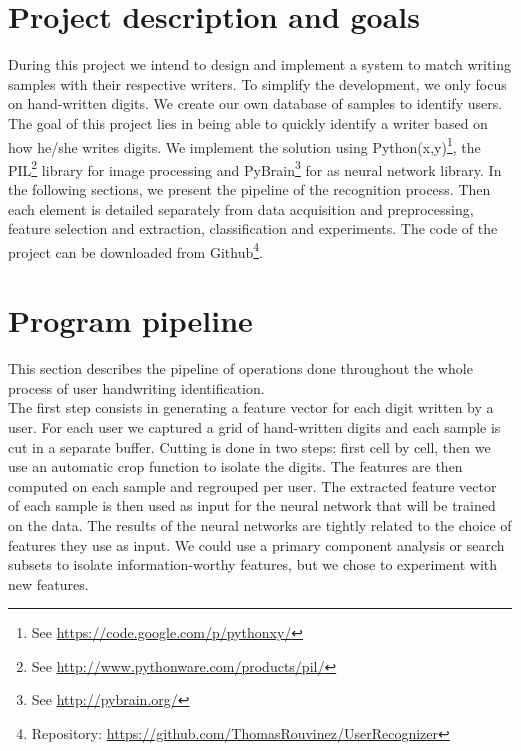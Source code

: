 \documentclass[a4paper]{article}
\begin{document}
{%

\section{Project description and goals}

During this project we intend to design and implement a system to match writing samples with their respective writers. To simplify the development, we only focus on hand-written digits. We create our own database of samples to identify users. The goal of this project lies in being able to quickly identify a writer based on how he/she writes digits. We implement the solution using Python(x,y)\footnote{See \url{https://code.google.com/p/pythonxy/}}, the PIL\footnote{See \url{http://www.pythonware.com/products/pil/}} library for image processing and PyBrain\footnote{See \url{http://pybrain.org/}} for as neural network library. In the following sections, we present the pipeline of the recognition process. Then each element is detailed separately from data acquisition and preprocessing, feature selection and extraction, classification and experiments. The code of the project can be downloaded from Github\footnote{Repository: \url{https://github.com/ThomasRouvinez/UserRecognizer}}.

\section{Program pipeline}

This section describes the pipeline of operations done throughout the whole process of user handwriting identification.\\

The first step consists in generating a feature vector for each digit written by a user. For each user we captured a grid of hand-written digits and each sample is cut in a separate buffer. Cutting is done in two steps: first cell by cell, then we use an automatic crop function to isolate the digits. The features are then computed on each sample and regrouped per user. The extracted feature vector of each sample is then used as input for the neural network that will be trained on the data. The results of the neural networks are tightly related to the choice of features they use as input. We could use a primary component analysis or search subsets to isolate information-worthy features, but we chose to experiment with new features.\\

}
\end{document}
